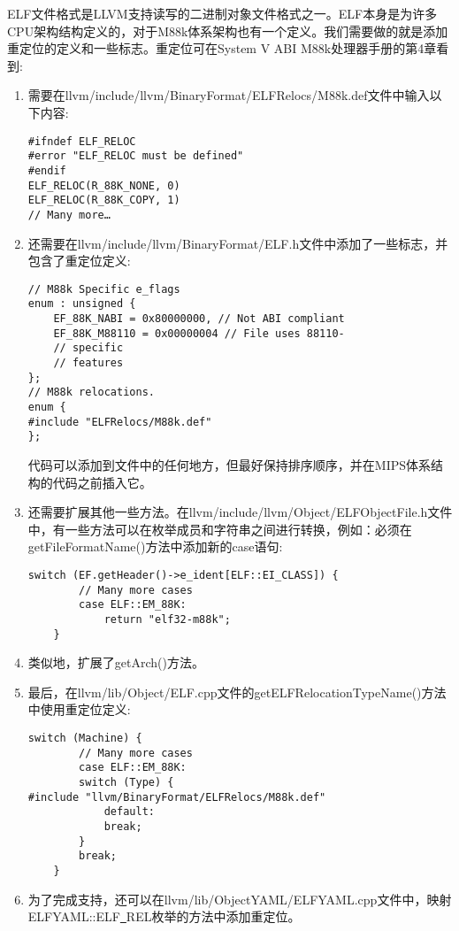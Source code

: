 ELF文件格式是LLVM支持读写的二进制对象文件格式之一。ELF本身是为许多CPU架构结构定义的，对于M88k体系架构也有一个定义。我们需要做的就是添加重定位的定义和一些标志。重定位可在System V ABI M88k处理器手册的第4章看到:\par

\begin{enumerate}
\item 需要在llvm/include/llvm/BinaryFormat/ELFRelocs/M88k.def文件中输入以下内容:
\begin{lstlisting}[caption={}]
#ifndef ELF_RELOC
#error "ELF_RELOC must be defined"
#endif
ELF_RELOC(R_88K_NONE, 0)
ELF_RELOC(R_88K_COPY, 1)
// Many more…
\end{lstlisting}

\item 还需要在llvm/include/llvm/BinaryFormat/ELF.h文件中添加了一些标志，并包含了重定位定义:
\begin{lstlisting}[caption={}]
// M88k Specific e_flags
enum : unsigned {
	EF_88K_NABI = 0x80000000, // Not ABI compliant
	EF_88K_M88110 = 0x00000004 // File uses 88110-
	// specific
	// features
};
// M88k relocations.
enum {
#include "ELFRelocs/M88k.def"
};
\end{lstlisting}
代码可以添加到文件中的任何地方，但最好保持排序顺序，并在MIPS体系结构的代码之前插入它。

\item 还需要扩展其他一些方法。在llvm/include/llvm/Object/ELFObjectFile.h文件中，有一些方法可以在枚举成员和字符串之间进行转换，例如：必须在getFileFormatName()方法中添加新的case语句:
\begin{lstlisting}[caption={}]
	switch (EF.getHeader()->e_ident[ELF::EI_CLASS]) {
		// Many more cases
		case ELF::EM_88K:
			return "elf32-m88k";
	}
\end{lstlisting}

\item 类似地，扩展了getArch()方法。

\item 最后，在llvm/lib/Object/ELF.cpp文件的getELFRelocationTypeName()方法中使用重定位定义:
\begin{lstlisting}[caption={}]
	switch (Machine) {
		// Many more cases
		case ELF::EM_88K:
		switch (Type) {
#include "llvm/BinaryFormat/ELFRelocs/M88k.def"
			default:
			break;
		}
		break;
	}
\end{lstlisting}

\item 为了完成支持，还可以在llvm/lib/ObjectYAML/ELFYAML.cpp文件中，映射ELFYAML::\allowbreak ELF\underline{~}REL枚举的方法中添加重定位。


\end{enumerate}
